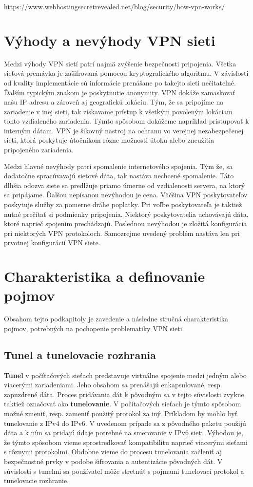 https://www.webhostingsecretrevealed.net/blog/security/how-vpn-works/

\section{Výhody a nevýhody VPN sieti}
Medzi výhody VPN sietí patrí najmä zvýšenie bezpečnosti pripojenia. Všetka sieťová premávka je zašifrovaná pomocou kryptografického algoritmu. V závislosti od kvality implementácie sú informácie prenášane po takejto sieti nečitatelné. Ďalším typickým znakom je poskytnutie anonymity. VPN dokáže zamaskovať našu IP adresu a zároveň aj geografickú lokáciu. Tým, že sa pripojíme na zariadenie v inej sieti, tak získavame prístup k všetkým povoleným lokáciam tohto vzdialeného zariadenia. Týmto spôsobom dokážeme napríklad pristupovať k interným dátam.
VPN je šikovný nastroj na ochranu vo verejnej nezabezpečenej sieti, ktorá poskytuje útočníkom rôzne možnosti útoku alebo zneužitia pripojeného zariadenia.

Medzi hlavné nevýhody patrí spomalenie internetového spojenia. Tým že, sa dodatočne spracúvavajú sieťové dáta, tak nastáva nechcené spomalenie. Táto dlhšia odozva siete sa predlžuje priamo úmerne od vzdialenosti servera, na ktorý sa pripájame. Ďalšou nepísanou nevýhodou je cena. Väčšina VPN poskytovateľov poskytuje služby za pomerne dráhe poplatky. Pri voľbe poskytovateľa je taktiež nutné prečítať si podmienky pripojenia. Niektorý poskytovatelia uchovávajú dáta, ktoré naprieč spojením prechádzajú. Poslednou nevýhodou je zložitá konfigurácia pri niektorých VPN protokoloch. Samozrejme uvedený problém nastáva len pri prvotnej konfigurácií VPN siete.   

\section{Charakteristika a definovanie pojmov}
Obsahom tejto podkapitoly je zavedenie a následne stručná charakteristika pojmov, potrebných na pochopenie problematiky VPN sieti.
\subsection{Tunel a tunelovacie rozhrania}
\textbf{Tunel} v počítačových sieťach predstavuje virtuálne spojenie medzi jedným alebo viacerými zariadeniami. Jeho obsahom sa prenášajú enkapsulované, resp. zapuzdrené dáta. Proces pridávania dát k pôvodným sa v tejto súvislosti zvykne taktiež označovať ako \textbf{tunelovanie}. V počítačových sieťach je týmto spôsobom možné zmeniť, resp. zameniť použitý protokol za iný. Príkladom by mohlo byť tunelovanie z IPv4 do IPv6. V uvedenom prípade sa z pôvodného paketu použijú dáta a k ním sa pridajú údaje potrebné na smerovanie v IPv6 sieti. Výhodou je, že týmto spôsobom vieme sprostredkovať kompatibilitu naprieč viacerými sieťami s rôznymi protokolmi. Obdobne vieme do procesu tunelovania začleniť aj bezpečnostné prvky v podobe šifrovania a autentizácie pôvodných dát. V súvislosti s tunelmi sa používateľ môže stretnúť s pojmami tunelovací protokol a tunelovacie rozhranie. 

